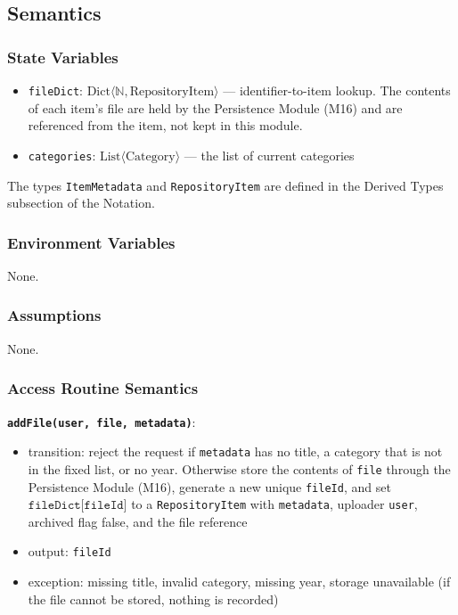 \documentclass[12pt, titlepage]{article}
\begin{document}
\subsection{Semantics}

\subsubsection{State Variables}
\begin{itemize}
  \item \texttt{fileDict}: $\text{Dict}\langle \mathbb{N}, \text{RepositoryItem} \rangle$ --- identifier-to-item lookup. The contents of each item's file are held by the Persistence Module (M16) and are referenced from the item, not kept in this module.
  \item \texttt{categories}: $\text{List}\langle \text{Category} \rangle$ --- the list of current categories
\end{itemize}


The types \texttt{ItemMetadata} and \texttt{RepositoryItem} are defined in the Derived Types subsection of the Notation.

\subsubsection{Environment Variables}
None.

\subsubsection{Assumptions}
None.

\subsubsection{Access Routine Semantics}

\textbf{\texttt{addFile(user, file, metadata)}}:
\begin{itemize}
  \item transition: reject the request if \texttt{metadata} has no title, a category that is not in the fixed list, or no year. Otherwise store the contents of \texttt{file} through the Persistence Module (M16), generate a new unique \texttt{fileId}, and set $\texttt{fileDict[fileId]}$ to a \texttt{RepositoryItem} with \texttt{metadata}, uploader \texttt{user}, archived flag false, and the file reference
  \item output: \texttt{fileId}
  \item exception: missing title, invalid category, missing year, storage unavailable (if the file cannot be stored, nothing is recorded)
\end{itemize}
\end{document}
